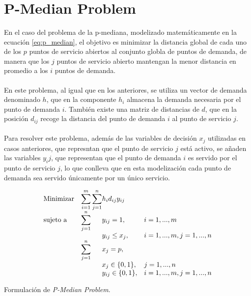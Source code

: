 \documentclass[spanish]{article}
\begin{document}
	\section{P-Median Problem}
	\label{sec:e-8}

		\paragraph{}
		En el caso del problema de la p-mediana, modelizado matemáticamente en la ecuación \ref{eq:p_median}, el objetivo es minimizar la distancia global de cada uno de los $p$ puntos de servicio abiertos al conjunto globla de puntos de demanda, de manera que los $j$ puntos de servicio abierto mantengan la menor distancia en promedio a los $i$ puntos de demanda.

		\paragraph{}
		En este problema, al igual que en los anteriores, se utiliza un vector de demanda denominado $h$, que en la componente $h_{i}$ almacena la demanda necesaria por el punto de demanda $i$. También existe una matriz de distancias de $d$, que en la posición $d_{ij}$ recoge la distancia del punto de demanda $i$ al punto de servicio $j$.

		\paragraph{}
		Para resolver este problema, además de las variables de decisión $x_j$ utilizadas en casos anteriores, que represntan que el punto de servicio $j$ está activo, se añaden las variables $y_ij$, que representan que el punto de demanda $i$ es servido por el punto de servicio $j$, lo que conlleva que en esta modelización cada punto de demanda sea servido únicamente por un único servicio.

		\begin{eqfloat}
			\begin{equation}
				\begin{array}{ll@{}ll}
					\text{Minimizar}
						& \displaystyle\sum\limits_{i = 1}^m
							\displaystyle\sum\limits_{j = 1}^n	& h_i d_{ij} y_{ij}	&							\\
					\text{sujeto a}
						& \displaystyle\sum\limits_{j = 1}^n 	& y_{ij} = 1,		& i = 1,..., m	\\
						& 																	 	& y_{ij} \leq x_{j},  		& i=1 ,..., m,j=1 ,..., n  \\
						& \displaystyle\sum\limits_{j = 1}^n 	& x_{j} = p,  		& 						\\
						&                                     &	x_{j} \in \{0,1\},&j=1 ,..., n 	\\
						&                                     &	y_{ij} \in \{0,1\},&i=1 ,..., m, j=1 ,..., n  \\
				\end{array}
			\end{equation}
			\caption{Formulación de \emph{P-Median Problem}.}
      \label{eq:p_median}
    \end{eqfloat}
\end{document}

